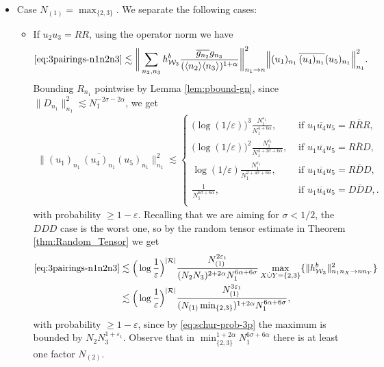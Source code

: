 \documentclass[11pt, xcolor = dvipsnames,reqno
]{amsart}
\theoremstyle{definition}
\theoremstyle{remark}
\begin{document}
\begin{itemize}
        \item Case $N_{(1)} = \operatorname{max}_{\{2,3\}}$. We separate the following cases: 
        \vspace{0.2cm}
        \begin{itemize}
            \item If $u_2 u_3 = RR$, using the operator norm we have
         \begin{align*}
             \eqref{eq:3pairings-n1n2n3} & \lesssim  \bigg\| \sum_{n_2,n_3} h^b_{\mathcal{W}_3} \frac{\overline{g_{n_2}} g_{n_3}}{(\langle n_2 \rangle \langle n_3 \rangle)^{1 + \alpha}} \bigg\|_{n_1 \rightarrow n}^2 
             \Big\| (u_1)_{n_1} \, \overline{(u_4)_{n_1}} (u_5)_{n_1}  \Big\|_{n_1}^2. 
         \end{align*}
        Bounding $R_{n_1}$ pointwise by Lemma \ref{lem:pbound-gn}, since $\lVert D_{n_1} \rVert_{n_1}^2 \lesssim N_1^{-2\sigma - 2\alpha}$, we get 
        \begin{align}\label{eq:3pairings-n2n4n5-n2}
            \big\| (u_1)_{n_1} \, \overline{(u_4)_{n_1}} (u_5)_{n_1}  \big\|_{n_1}^2
            \lesssim \begin{cases}
                \big(\log(1/\varepsilon)\big)^3 \displaystyle \frac{N_{1}^{\varepsilon_1}}{N_1^{4 + 6 \alpha}}, & \text{ if } u_1 \overline{u_4} u_5 = R\overline R R, \\ 
                \big(\log(1/\varepsilon) \big)^2 \displaystyle \frac{N_1^{\varepsilon_1}}{N_1^{4 + 2\sigma + 6\alpha}}, & \text{ if } u_1 \overline{u_4} u_5 = R \overline R D, \\
                \log(1/\varepsilon) \displaystyle\frac{N_1^{\varepsilon_1}}{N_1^{2 + 4\sigma + 6\alpha}}, & \text{ if } u_1 \overline{u_4} u_5 = R \overline D D, \\
                \displaystyle \frac{1}{N_1^{6\sigma + 6\alpha}}, & \text{ if } u_1 \overline{u_4} u_5 = D \overline D D,. \\
            \end{cases}
        \end{align}
        with probability $\geq 1 - \varepsilon$. 
        Recalling that we are aiming for $\sigma < 1/2$, the $DDD$ case is the worst one,
        so by the random tensor estimate in Theorem \ref{thm:Random_Tensor} we get
        \begin{align*}
             \eqref{eq:3pairings-n1n2n3} & \lesssim 
             \Big(\log  \frac{1}{\varepsilon} \Big)^{|\mathcal R|}
            \frac{ N_{(1)}^{2\varepsilon_1}}{(N_2 N_3)^{2 + 2\alpha}N_1^{6 \alpha + 6 \sigma}}  \max_{X \dot\cup Y = \{2,3\}} \{\|h^b_{\mathcal{W}_3}\|_{n_1n_X \rightarrow nn_Y}^2\} \\
            &\lesssim  \Big(\log  \frac{1}{\varepsilon} \Big)^{|\mathcal R|} \frac{N_{(1)}^{3\varepsilon_1}}{(N_{(1)} \operatorname{min}_{\{2,3\}})^{1 + 2\alpha} N_1^{6 \alpha + 6 \sigma}  },
         \end{align*}
        with probability  $\geq 1 - \varepsilon$, since by \eqref{eq:schur-prob-3p} 
        the maximum is bounded by $N_2 N_3^{1+\varepsilon_1}$. 
        Observe that in $\operatorname{min}_{\{2,3\}}^{1 + 2\alpha} N_1^{6 \sigma + 6 \alpha}$ there is at least one factor $N_{(2)}$.


\end{itemize}
\end{itemize}
\end{document}
